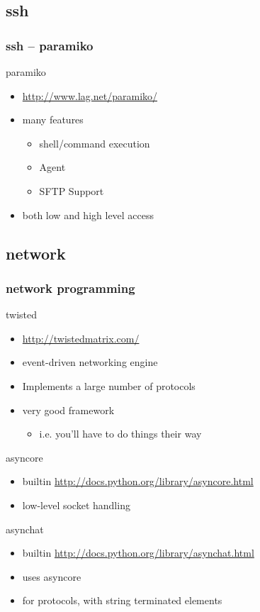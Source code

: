 \documentclass{beamer}
\begin{document}
\subsection*{ssh}
\begin{frame}
	\frametitle{ssh -- paramiko}
	\begin{block}{paramiko}
	\begin{itemize}
		\item \url{http://www.lag.net/paramiko/}
		\item many features
		\begin{itemize}
			\item shell/command execution
			\item Agent
			\item SFTP Support
		\end{itemize}
		\item both low and high level access
	\end{itemize}
	\end{block}
\end{frame}

\subsection*{network}
\begin{frame}[allowframebreaks]
	\frametitle{network programming}
	\begin{block}{twisted}
	\begin{itemize}
		\item \url{http://twistedmatrix.com/}
		\item event-driven networking engine
		\item Implements a large number of protocols
		\item very good framework
		\begin{itemize}
			\item i.e. you'll have to do things their way
		\end{itemize}
	\end{itemize}
	\end{block}	
\framebreak
	\begin{block}{asyncore}
	\begin{itemize}
		\item builtin \url{http://docs.python.org/library/asyncore.html}
		\item low-level socket handling
	\end{itemize}
	\end{block}
	
	\begin{block}{asynchat}
	\begin{itemize}
		\item builtin \url{http://docs.python.org/library/asynchat.html}
		\item uses asyncore
		\item for protocols, with string terminated elements
	\end{itemize}
	\end{block}
\end{frame}
\end{document}
